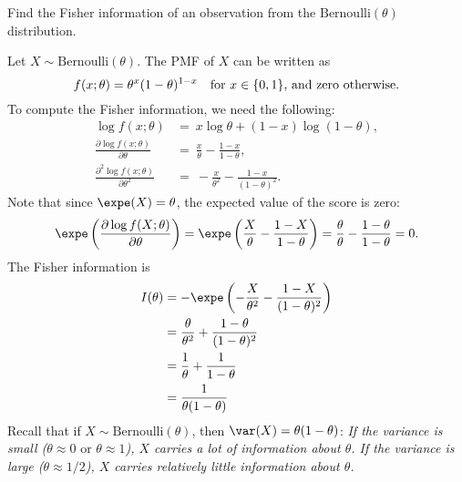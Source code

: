 \begin{example}
Find the Fisher information of an observation from the $\text{Bernoulli}(\theta)$ distribution.
\begin{solution}
Let $X\sim\text{Bernoulli}(\theta)$. The PMF of $X$ can be written as
\[
f(x;\theta)=\theta^x(1-\theta)^{1-x} \text{\quad for $x\in\{0,1\}$, and zero otherwise.}
\]
To compute the Fisher information, we need the following:
\begin{align*}
\log f(x;\theta)
	& = \ x\log\theta + (1-x)\log(1-\theta), \\[2ex]
\frac{\partial \log f(x;\theta)}{\partial\theta}
	& = \ \frac{x}{\theta} - \frac{1-x}{1-\theta}, \\[2ex]
\frac{\partial^2 \log f(x;\theta)}{\partial\theta^2}
	& = \ -\frac{x}{\theta^2} - \frac{1-x}{(1-\theta)^2}.
\end{align*}
Note that since $\expe(X)=\theta$, the expected value of the score is zero:
\[
\expe\left(\frac{\partial\log f(X;\theta)}{\partial\theta}\right) 
	= \expe\left(\frac{X}{\theta} - \frac{1-X}{1-\theta}\right)
	= \frac{\theta}{\theta} - \frac{1-\theta}{1-\theta}
	= 0.
\]
The Fisher information is 
\begin{align*}
I(\theta)
	& = -\expe\left(-\frac{X}{\theta^2}-\frac{1-X}{(1-\theta)^2}\right) \\
	& = \frac{\theta}{\theta^2}+\frac{1-\theta}{(1-\theta)^2} \\
	& = \frac{1}{\theta}+\frac{1}{1-\theta} \\
	& = \frac{1}{\theta(1-\theta)}
\end{align*}
Recall that if $X\sim\text{Bernoulli}(\theta)$, then $\var(X)=\theta(1-\theta)$:
\bit
\it If the variance is small ($\theta\approx 0 \text{ or } \theta\approx 1$), $X$ carries a lot of information about $\theta$.
\it If the variance is large ($\theta\approx 1/2$), $X$ carries relatively little information about $\theta$.
\eit
\end{solution}
\end{example}


